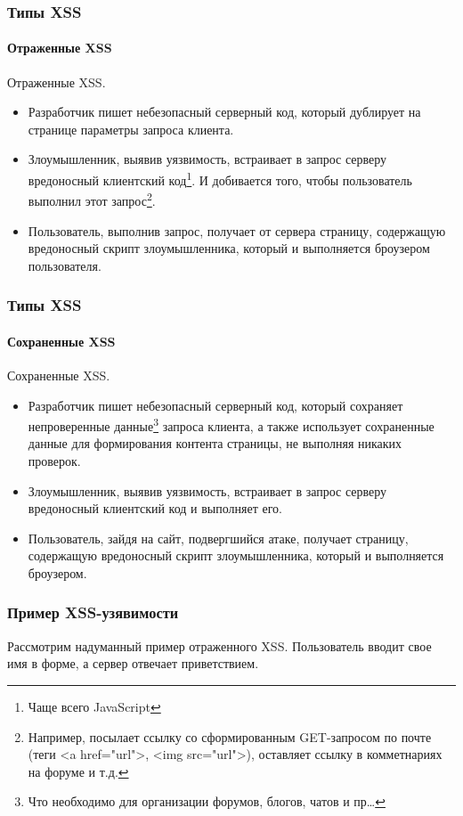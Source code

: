 \begin{frame}[fragile]
    \frametitle{Типы XSS}
    \framesubtitle{Отраженные XSS}

    \alert{Отраженные XSS}. 
    \begin{itemize}
        \item Разработчик пишет небезопасный серверный код, который дублирует на странице параметры запроса клиента.
        \item Злоумышленник, выявив уязвимость, встраивает в запрос серверу вредоносный клиентский код\footnote{Чаще всего JavaScript}. И добивается того, чтобы пользователь выполнил этот запрос\footnote{Например, посылает ссылку со сформированным GET-запросом по почте (теги {<}a href="url"{>}, {<}img src="url"{>}), оставляет ссылку в комметнариях на форуме и т.д.}.
        \item Пользователь, выполнив запрос, получает от сервера страницу, содержащую вредоносный скрипт злоумышленника, который и выполняется броузером пользователя.
    \end{itemize}
\end{frame}


\begin{frame}
    \frametitle{Типы XSS}
    \framesubtitle{Сохраненные XSS}

    \alert{Сохраненные XSS}. 
    \begin{itemize}
        \item Разработчик пишет небезопасный серверный код, который сохраняет непроверенные данные\footnote{Что необходимо для организации форумов, блогов, чатов и пр\ldots} запроса клиента, а также использует сохраненные данные для формирования контента страницы, не выполняя никаких проверок.
        
        \item Злоумышленник, выявив уязвимость, встраивает в запрос серверу вредоносный клиентский код и выполняет его.
        
        \item Пользователь, зайдя на сайт, подвергшийся атаке, получает страницу, содержащую вредоносный скрипт злоумышленника, который и выполняется броузером.
    \end{itemize}
\end{frame}

\begin{frame}
    \frametitle{Пример XSS-узявимости}
    
    Рассмотрим надуманный пример отраженного XSS. Пользователь вводит свое имя в форме, а сервер отвечает приветствием. 
    
\end{frame}

